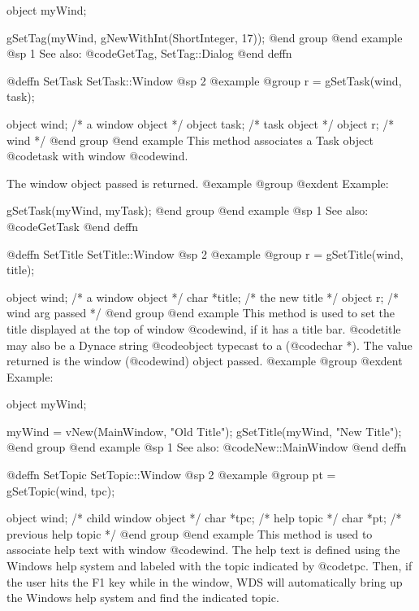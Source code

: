 object  myWind;

gSetTag(myWind, gNewWithInt(ShortInteger, 17));
@end group
@end example
@sp 1
See also:  @code{GetTag, SetTag::Dialog}
@end deffn












@deffn {SetTask} SetTask::Window
@sp 2
@example
@group
r = gSetTask(wind, task);

object  wind;   /*  a window object  */
object  task;   /*  task object      */
object  r;      /*  wind             */
@end group
@end example
This method associates a Task object @code{task} with window
@code{wind}.

The window object passed is returned.
@example
@group
@exdent Example:

gSetTask(myWind, myTask);
@end group
@end example
@sp 1
See also:  @code{GetTask}
@end deffn




@deffn {SetTitle} SetTitle::Window
@sp 2
@example
@group
r = gSetTitle(wind, title);

object  wind;    /*  a window object     */
char    *title;  /*  the new title       */
object  r;       /*  wind arg passed     */
@end group
@end example
This method is used to set the title displayed at the top of window
@code{wind}, if it has a title bar.  @code{title} may also be a Dynace
string @code{object} typecast to a (@code{char *}).  The value returned
is the window (@code{wind}) object passed.
@example
@group
@exdent Example:

object  myWind;

myWind = vNew(MainWindow, "Old Title");
gSetTitle(myWind, "New Title");
@end group
@end example
@sp 1
See also:  @code{New::MainWindow}
@end deffn













@deffn {SetTopic} SetTopic::Window
@sp 2
@example
@group
pt = gSetTopic(wind, tpc);

object  wind;   /*  child window object   */
char    *tpc;   /*  help topic            */
char    *pt;    /*  previous help topic   */
@end group
@end example
This method is used to associate help text with window @code{wind}.
The help text is defined using the Windows help system and labeled
with the topic indicated by @code{tpc}.  Then, if the user hits
the F1 key while in the window, WDS will automatically bring up
the Windows help system and find the indicated topic.

